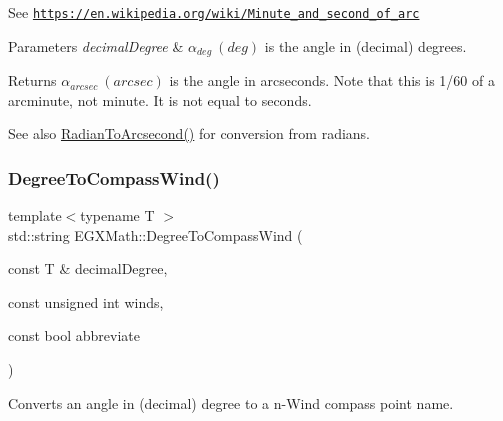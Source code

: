 See \href{https://en.wikipedia.org/wiki/Minute_and_second_of_arc}{\tt https\+://en.\+wikipedia.\+org/wiki/\+Minute\+\_\+and\+\_\+second\+\_\+of\+\_\+arc} 
\begin{DoxyParams}{Parameters}
{\em decimal\+Degree} & $\alpha_{deg}\ (deg)$ is the angle in (decimal) degrees. \\
\hline
\end{DoxyParams}
\begin{DoxyReturn}{Returns}
$\alpha_{arcsec}\ (arcsec)$ is the angle in arcseconds. Note that this is 1/60 of a arcminute, not minute. It is not equal to seconds. 
\end{DoxyReturn}
\begin{DoxySeeAlso}{See also}
\mbox{\hyperlink{group___e_g_x_math-_angle_conversions-_radian_ga2f952f6675a0fc54bf72bfe4e3d2664a}{Radian\+To\+Arcsecond()}} for conversion from radians. 
\end{DoxySeeAlso}
\mbox{\label{group___e_g_x_math-_angle_conversions-_degree_ga5ffef873bcec300ab90570ad6e7b1ab1}} 
\subsubsection{\texorpdfstring{Degree\+To\+Compass\+Wind()}{DegreeToCompassWind()}}
{\footnotesize\ttfamily template$<$typename T $>$ \\
std\+::string E\+G\+X\+Math\+::\+Degree\+To\+Compass\+Wind (\begin{DoxyParamCaption}\item[{const T \&}]{decimal\+Degree,  }\item[{const unsigned int}]{winds,  }\item[{const bool}]{abbreviate }\end{DoxyParamCaption})}



Converts an angle in (decimal) degree to a n-\/\+Wind compass point name. 

